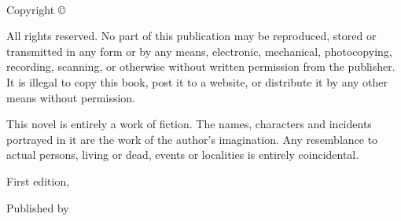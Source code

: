 
{\small
\setlength{\parindent}{0em}\setlength{\parskip}{1em}

~

\vfill

Copyright \copyright{} \editionyear{} \authorname

All rights reserved. No part of this publication may be reproduced, stored or transmitted in any form or by any means, electronic, mechanical, photocopying, recording, scanning, or otherwise without written permission from the publisher. It is illegal to copy this book, post it to a website, or distribute it by any other means without permission.

This novel is entirely a work of fiction. The names, characters and incidents portrayed in it are the work of the author’s imagination. Any resemblance to actual persons, living or dead, events or localities is entirely coincidental.

First edition, \editionyear{}


Published by \publisher{}
}
